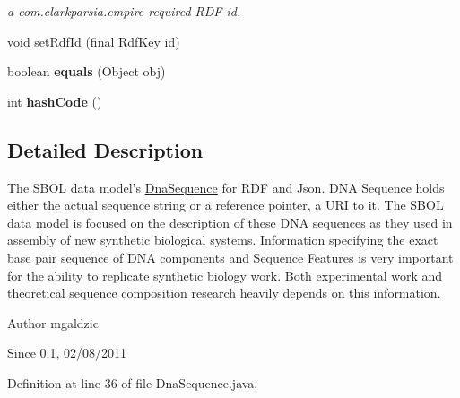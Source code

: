 \begin{DoxyCompactItemize}
\begin{DoxyCompactList}\small\item\em a com.clarkparsia.empire required RDF id. \item\end{DoxyCompactList}\item 
void \hyperlink{classorg_1_1sbolstandard_1_1lib_s_b_o_lj_1_1_dna_sequence_a4c87a5e39f780ec94fd91a31d9374394}{setRdfId} (final RdfKey id)
\item 
\hypertarget{classorg_1_1sbolstandard_1_1lib_s_b_o_lj_1_1_dna_sequence_a212bd5dc05cbb2ea8f08d316921141b0}{
boolean {\bfseries equals} (Object obj)}
\label{classorg_1_1sbolstandard_1_1lib_s_b_o_lj_1_1_dna_sequence_a212bd5dc05cbb2ea8f08d316921141b0}

\item 
\hypertarget{classorg_1_1sbolstandard_1_1lib_s_b_o_lj_1_1_dna_sequence_a9a8f03a493f263cba260f786f684ce33}{
int {\bfseries hashCode} ()}
\label{classorg_1_1sbolstandard_1_1lib_s_b_o_lj_1_1_dna_sequence_a9a8f03a493f263cba260f786f684ce33}

\end{DoxyCompactItemize}


\subsection{Detailed Description}
The SBOL data model's \hyperlink{classorg_1_1sbolstandard_1_1lib_s_b_o_lj_1_1_dna_sequence}{DnaSequence} for RDF and Json. DNA Sequence holds either the actual sequence string or a reference pointer, a URI to it. The SBOL data model is focused on the description of these DNA sequences as they used in assembly of new synthetic biological systems. Information specifying the exact base pair sequence of DNA components and Sequence Features is very important for the ability to replicate synthetic biology work. Both experimental work and theoretical sequence composition research heavily depends on this information.

\begin{DoxyAuthor}{Author}
mgaldzic 
\end{DoxyAuthor}
\begin{DoxySince}{Since}
0.1, 02/08/2011 
\end{DoxySince}


Definition at line 36 of file DnaSequence.java.



